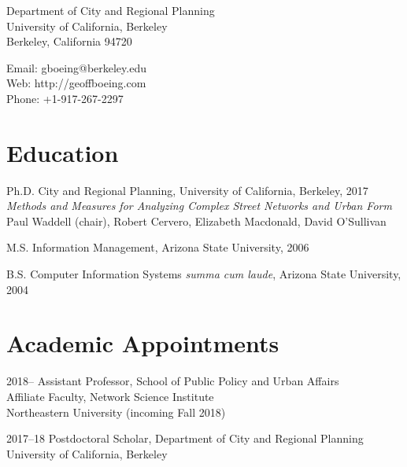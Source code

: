 \documentclass{academiccv}
\begin{document}
\raggedright

\namefont{\myname}

\vspace{1em}
\begin{minipage}[t]{0.495\textwidth}
  Department of City and Regional Planning \\
  University of California, Berkeley \\
  Berkeley, California 94720
\end{minipage}
\begin{minipage}[t]{0.495\textwidth}
  Email: gboeing@berkeley.edu \\
  Web: http://geoffboeing.com \\
  Phone: +1-917-267-2297
\end{minipage}
\vspace{0.5em}



\section*{Education}

\begin{tablist}
	
\item[Ph.D.] \tab City and Regional Planning, University of California, Berkeley, 2017 \\
                  \textit{Methods and Measures for Analyzing Complex Street Networks and Urban Form} \\
                  Paul Waddell (chair), Robert Cervero, Elizabeth Macdonald, David O'Sullivan
                  
\item[M.S.]  \tab Information Management, Arizona State University, 2006

\item[B.S.]  \tab Computer Information Systems \textit{summa cum laude}, Arizona State University, 2004

\end{tablist}



\section*{Academic Appointments}

\begin{tablist}                     
	
	\item[2018--]     \tab Assistant Professor, School of Public Policy and Urban Affairs \\
			 		       Affiliate Faculty, Network Science Institute \\
			 			   Northeastern University (incoming Fall 2018)

	\item[2017--18]   \tab Postdoctoral Scholar, Department of City and Regional Planning \\
	                       University of California, Berkeley

\end{tablist}
\end{document}
